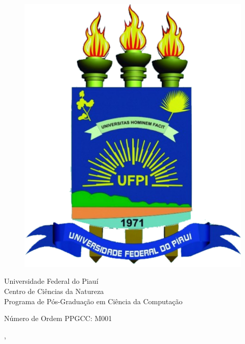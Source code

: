   \begin{capa}%
    \begin{figure}[h!]%
        \centering%
        \includegraphics[scale=0.2]{figs/logo.pdf}%
      \end{figure}%
    \center
	\ABNTEXchapterfont\large{Universidade Federal do Piau\'i \\ Centro de Ci\^encias da Natureza \\ Programa de P\'os-Gradua\c{c}\~ao em Ci\^encia da Computa\c{c}\~ao}

    \vfill
    \ABNTEXchapterfont\bfseries\LARGE\imprimirtitulo
    \vfill

	\ABNTEXchapterfont\large\imprimirautor
	\vfill
%
	Número de Ordem PPGCC: M001
	
    \large\imprimirlocal, \large\imprimirdata

    \vspace*{1cm}
  \end{capa}
